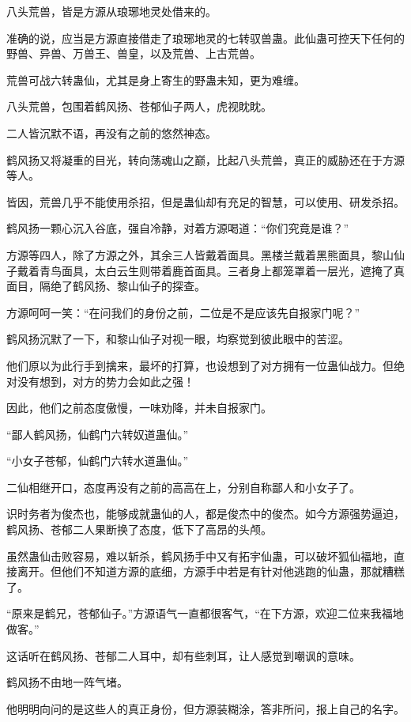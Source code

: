 \begin{this_body}
八头荒兽，皆是方源从琅琊地灵处借来的。

准确的说，应当是方源直接借走了琅琊地灵的七转驭兽蛊。此仙蛊可控天下任何的野兽、异兽、万兽王、兽皇，以及荒兽、上古荒兽。

荒兽可战六转蛊仙，尤其是身上寄生的野蛊未知，更为难缠。

八头荒兽，包围着鹤风扬、苍郁仙子两人，虎视眈眈。

二人皆沉默不语，再没有之前的悠然神态。

鹤风扬又将凝重的目光，转向荡魂山之巅，比起八头荒兽，真正的威胁还在于方源等人。

皆因，荒兽几乎不能使用杀招，但是蛊仙却有充足的智慧，可以使用、研发杀招。

鹤风扬一颗心沉入谷底，强自冷静，对着方源喝道：“你们究竟是谁？”

方源等四人，除了方源之外，其余三人皆戴着面具。黑楼兰戴着黑熊面具，黎山仙子戴着青鸟面具，太白云生则带着鹿首面具。三者身上都笼罩着一层光，遮掩了真面目，隔绝了鹤风扬、黎山仙子的探查。

方源呵呵一笑：“在问我们的身份之前，二位是不是应该先自报家门呢？”

鹤风扬沉默了一下，和黎山仙子对视一眼，均察觉到彼此眼中的苦涩。

他们原以为此行手到擒来，最坏的打算，也设想到了对方拥有一位蛊仙战力。但绝对没有想到，对方的势力会如此之强！

因此，他们之前态度傲慢，一味劝降，并未自报家门。

“鄙人鹤风扬，仙鹤门六转奴道蛊仙。”

“小女子苍郁，仙鹤门六转水道蛊仙。”

二仙相继开口，态度再没有之前的高高在上，分别自称鄙人和小女子了。

识时务者为俊杰也，能够成就蛊仙的人，都是俊杰中的俊杰。如今方源强势逼迫，鹤风扬、苍郁二人果断换了态度，低下了高昂的头颅。

虽然蛊仙击败容易，难以斩杀，鹤风扬手中又有拓宇仙蛊，可以破坏狐仙福地，直接离开。但他们不知道方源的底细，方源手中若是有针对他逃跑的仙蛊，那就糟糕了。

“原来是鹤兄，苍郁仙子。”方源语气一直都很客气，“在下方源，欢迎二位来我福地做客。”

这话听在鹤风扬、苍郁二人耳中，却有些刺耳，让人感觉到嘲讽的意味。

鹤风扬不由地一阵气堵。

他明明向问的是这些人的真正身份，但方源装糊涂，答非所问，报上自己的名字。


\end{this_body}
